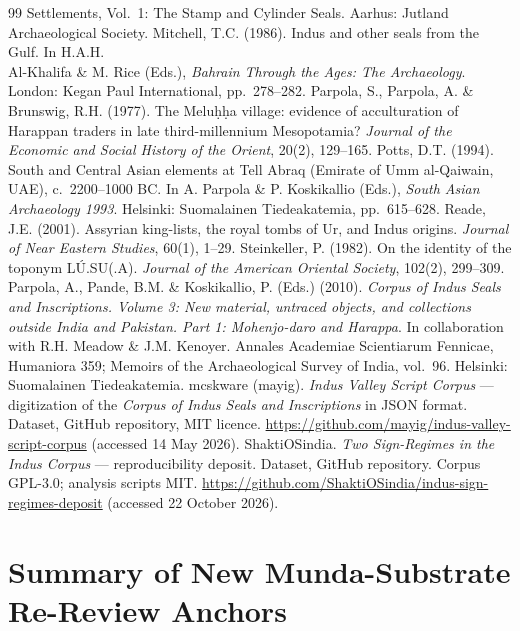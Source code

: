 \documentclass[11pt]{article}
\begin{document}
\begin{thebibliography}{99}
{  Settlements, Vol.~1: The Stamp and Cylinder Seals}. Aarhus:
  Jutland Archaeological Society.
  Mitchell, T.C. (1986). Indus and other seals from the Gulf. In
  H.A.H.\\ Al-Khalifa \& M. Rice (Eds.), \emph{Bahrain Through the
  Ages: The Archaeology}. London: Kegan Paul International, pp.~278--282.
  Parpola, S., Parpola, A. \& Brunswig, R.H. (1977). The Melu\d{h}\d{h}a
  village: evidence of acculturation of Harappan traders in late
  third-millennium Mesopotamia? \emph{Journal of the Economic and
  Social History of the Orient}, 20(2), 129--165.
  Potts, D.T. (1994). South and Central Asian elements at Tell Abraq
  (Emirate of Umm al-Qaiwain, UAE), c.~2200--1000 BC. In
  A. Parpola \& P. Koskikallio (Eds.), \emph{South Asian Archaeology
  1993}. Helsinki: Suomalainen Tiedeakatemia, pp.~615--628.
  Reade, J.E. (2001). Assyrian king-lists, the royal tombs of Ur, and
  Indus origins. \emph{Journal of Near Eastern Studies}, 60(1), 1--29.
  Steinkeller, P. (1982). On the identity of the toponym
  L\'{U}.SU(.A). \emph{Journal of the American Oriental Society},
  102(2), 299--309.
  Parpola, A., Pande, B.M. \& Koskikallio, P. (Eds.) (2010).
  \emph{Corpus of Indus Seals and Inscriptions. Volume 3: New material,
  untraced objects, and collections outside India and Pakistan. Part 1:
  Mohenjo-daro and Harappa}. In collaboration with R.H. Meadow \&
  J.M. Kenoyer. Annales Academiae Scientiarum Fennicae, Humaniora 359;
  Memoirs of the Archaeological Survey of India, vol.~96. Helsinki:
  Suomalainen Tiedeakatemia.
  mcskware (mayig). \emph{Indus Valley Script Corpus} --- digitization
  of the \emph{Corpus of Indus Seals and Inscriptions} in JSON format.
  Dataset, GitHub repository, MIT licence.
  \url{https://github.com/mayig/indus-valley-script-corpus}
  (accessed 14 May 2026).
  ShaktiOSindia. \emph{Two Sign-Regimes in the Indus Corpus} ---
  reproducibility deposit. Dataset, GitHub repository. Corpus GPL-3.0;
  analysis scripts MIT.
  \url{https://github.com/ShaktiOSindia/indus-sign-regimes-deposit}
  (accessed 22 October 2026).
\end{thebibliography}

\appendix

\section{Summary of New Munda-Substrate Re-Review
Anchors}\label{appendix-a-summary-of-new-phase-128129-anchors}
\end{document}
